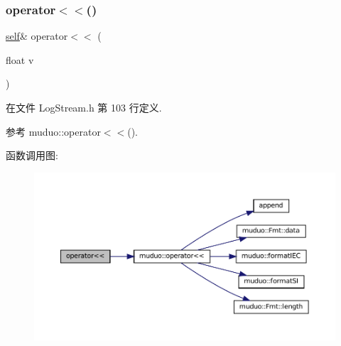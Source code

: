 \mbox{\label{classmuduo_1_1LogStream_af2e8316650b99036d696fcc0da89bdbe}} 
\subsubsection{\texorpdfstring{operator$<$$<$()}{operator<<()}\hspace{0.1cm}{\footnotesize\ttfamily [11/18]}}
{\footnotesize\ttfamily \hyperlink{classmuduo_1_1LogStream_a85e87a809801549b949fc3f7f8c816bd}{self}\& operator$<$$<$ (\begin{DoxyParamCaption}\item[{float}]{v }\end{DoxyParamCaption})\hspace{0.3cm}{\ttfamily [inline]}}



在文件 Log\+Stream.\+h 第 103 行定义.



参考 muduo\+::operator$<$$<$().

函数调用图\+:
\nopagebreak
\begin{figure}[H]
\begin{center}
\leavevmode
\includegraphics[width=350pt]{classmuduo_1_1LogStream_af2e8316650b99036d696fcc0da89bdbe_cgraph}
\end{center}
\end{figure}
\mbox{\label{classmuduo_1_1LogStream_aa4fea7ce9aa4664e692f6ee596e3b120}} 
